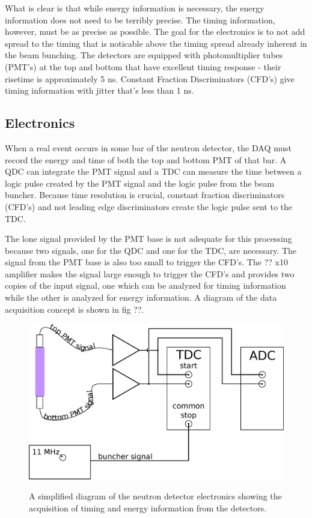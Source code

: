 What is clear is that while energy information is necessary, the energy information does not need to be terribly precise.  The timing information, however, must be as precise as possible.  The goal for the electronics is to not add spread to the timing that is noticable above the timing spread already inherent in the beam bunching.  The detectors are equipped with photomultiplier tubes (PMT's) at the top and bottom that have excellent timing response - their risetime is approximately 5 ns.  Constant Fraction Discriminators (CFD's) give timing information with jitter that's less than 1 ns.

\subsection{Electronics}
When a real event occurs in some bar of the neutron detector, the DAQ must record the energy and time of both the top and bottom PMT of that bar.  A QDC can integrate the PMT signal and a TDC can measure the time between a logic pulse created by the PMT signal and the logic pulse from the beam buncher.  Because time resolution is crucial, constant fraction discriminators (CFD's) and not leading edge discriminators create the logic pulse sent to the TDC.  

The lone signal provided by the PMT base is not adequate for this processing because two signals, one for the QDC and one for the TDC, are necessary.  The signal from the PMT base is also too small to trigger the CFD's.  The ?? x10 amplifier makes the signal large enough to trigger the CFD's and provides two copies of the input signal, one which can be analyzed for timing information while the other is analyzed for energy information.  A diagram of the data acquisition concept is shown in fig ??.

\begin{figure}[ht]
\centering
\includegraphics[width=1.0\textwidth]{figures/basic_electronics.eps}
\label{fig:simpleElectronics}
\caption{A simplified diagram of the neutron detector electronics showing the acquisition of timing and energy information from the detectors.}
\end{figure}

